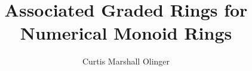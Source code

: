 \documentclass{sfsuthesis}
\theoremstyle{definition}
\begin{document}

\title{Associated Graded Rings for Numerical Monoid Rings}
\author{Curtis Marshall Olinger}

\maketitle
\copyrightpage

\frontmatter


\tableofcontents
\clearpage

\mainmatter


\pagestyle{headings}







\renewcommand{\baselinestretch}{1.0}
\selectfont




\printbibliography
\end{document}
